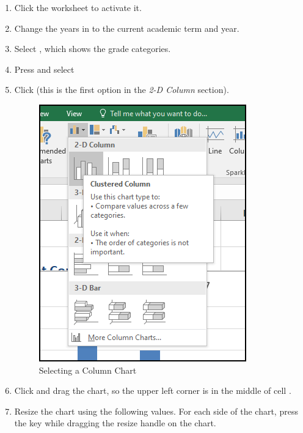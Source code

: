 \begin{enumbox}
	\begin{enumerate}
		\item Click the  worksheet to activate it.
		\item Change the years in  to the current academic term and year.
		\item Select , which shows the grade categories.
		\item Press  and select 
		\item Click  (this is the first option in the \textit{2-D Column} section).
		
		\begin{figure}[H]
			\centering
			\includegraphics[width=\maxwidth{.65\linewidth}]{gfx/ch04_fig13}
			\caption{Selecting a Column Chart}
			\label{04:fig13}
		\end{figure}
			
		\item Click and drag the chart, so the upper left corner is in the middle of cell .
		\item Resize the chart using the following values. For each side of the chart, press the  key while dragging the resize handle on the chart.
	

\end{enumerate}
\end{enumbox}
